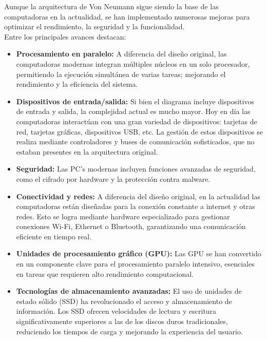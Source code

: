 \documentclass[12pt,letterpaper]{article}
\begin{document}
\begin{enumerate}
    \bigskip

    Aunque la arquitectura de Von Neumann sigue siendo la base de las computadoras en la actualidad, se han implementado numerosas mejoras para optimizar el rendimiento, la seguridad y la funcionalidad. \\
    Entre los principales avances destacan:
    
    \begin{itemize}
    \item \textbf{Procesamiento en paralelo:} 
      A diferencia del diseño original, las computadoras modernas integran múltiples núcleos en un solo procesador, permitiendo la ejecución simultánea de varias tareas; mejorando el rendimiento y la eficiencia del sistema.
      
    \item \textbf{Dispositivos de entrada/salida:}
      Si bien el diagrama incluye dispositivos de entrada y salida, la complejidad actual es mucho mayor. Hoy en día las computadoras interactúan con una gran variedad de dispositivos: tarjetas de red, tarjetas gráficas, dispositivos USB, etc. La gestión de estos dispositivos se realiza mediante controladores y buses de comunicación sofisticados, que no estaban presentes en la arquitectura original.
      
    \item \textbf{Seguridad:}
      Las PC's modernas incluyen funciones avanzadas de seguridad, como el cifrado por hardware y la protección contra malware.
      
    \item \textbf{Conectividad y redes:}
      A diferencia del diseño original, en la actualidad las computadoras están diseñadas para la conexión constante a internet y otras redes. Esto se logra mediante hardware especializado para gestionar conexiones Wi-Fi, Ethernet o Bluetooth, garantizando una comunicación eficiente en tiempo real.
      
    \item \textbf{Unidades de procesamiento gráfico (GPU):} 
      Las GPU se han convertido en un componente clave para el procesamiento paralelo intensivo, esenciales en tareas que requieren alto rendimiento computacional.
      
    \item \textbf{Tecnologías de almacenamiento avanzadas:}
      El uso de unidades de estado sólido (SSD) ha revolucionado el acceso y almacenamiento de información. Los SSD ofrecen velocidades de lectura y escritura significativamente superiores a las de los discos duros tradicionales, reduciendo los tiempos de carga y mejorando la experiencia del usuario.
      

\end{itemize}
\end{enumerate}
\end{document}
